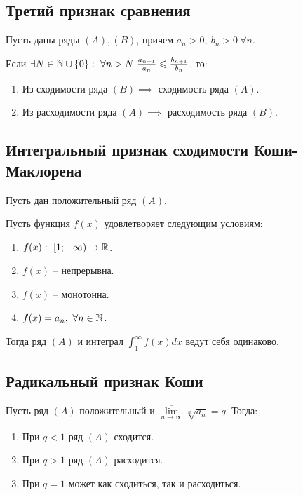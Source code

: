 \subsection{Третий признак сравнения}

\begin{theorem}
    Пусть даны ряды $ (A),(B) $, причем $a_n > 0, \ b_n > 0 \ \forall n$.

    Если $\exists N \in \N \cup \{0\}: \ \forall n > N \ \frac{a_{n+1}}{a_n}\leqslant\frac{b_{n+1}}{b_n} $, то:
    \begin{enumerate}
        \item Из сходимости ряда $(B) \implies$ сходимость ряда $(A)$.
        \item Из расходимости ряда $(A) \implies$ расходимость ряда $(B)$.
    \end{enumerate}
\end{theorem}

\subsection{Интегральный признак сходимости Коши-Маклорена}

\begin{theorem}
    Пусть дан положительный ряд $ (A) $.

    Пусть функция $f(x)$ удовлетворяет следующим условиям:
    \begin{enumerate}
        \item $f(x): \ [1;+\infty) \rightarrow\mathbb{R}$.
        \item $f(x)$ -- непрерывна.
        \item $f(x)$ -- монотонна.
        \item $f(x) = a_n, \ \forall n \in \mathbb{N}$.
    \end{enumerate}

    Тогда ряд $(A)$ и интеграл $\int_{1}^{\infty}f(x)dx$ ведут себя одинаково.
\end{theorem}

\subsection{Радикальный признак Коши}

\begin{theorem}
    Пусть ряд $(A)$ положительный и $\underset{n\rightarrow\infty}{\overline{\lim}}\sqrt[n]{a_n} = q$. Тогда:
    \begin{enumerate}
        \item При $q < 1$ ряд $(A)$ сходится.
        \item При $q > 1$ ряд $(A)$ расходится.
        \item При $q = 1$ может как сходиться, так и расходиться.
    \end{enumerate}
\end{theorem}

